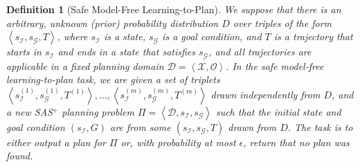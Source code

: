 \documentclass{article}
\newtheorem{definition}{Definition}
\newcommand{\tuple}[1]{\ensuremath{\left \langle #1 \right \rangle }}
\newcommand{\SAS}{SAS$^+$}
\begin{document}
	\begin{definition}[Safe Model-Free Learning-to-Plan] We suppose that there is an arbitrary, unknown (prior) probability distribution $D$ over triples of the form $\tuple{s_\mathcal{I}, s_\mathcal{G}, T}$, where $s_\mathcal{I}$ is a state, $s_\mathcal{G}$ is a goal condition, and $T$ is a trajectory that starts in $s_\mathcal{I}$ and ends in a state that satisfies $s_\mathcal{G}$, 
		and all trajectories are applicable in a fixed planning domain $\mathcal{D}=\tuple{\mathcal{X}, \mathcal{O}}$. 
		In the safe model-free learning-to-plan task, we are given a set of triplets $\tuple{s_\mathcal{I}^{(1)},s_\mathcal{G}^{(1)},T^{(1)}},\ldots,\tuple{s_\mathcal{I}^{(m)},s_\mathcal{G}^{(m)},T^{(m)}}$ drawn independently from $D$, 
		and a new \SAS{} planning problem $\Pi=\tuple{\mathcal{D}, s_\mathcal{I}, s_\mathcal{G}}$  
		such that the initial state and goal condition $(s_\mathcal{I},G)$ are from some $(s_\mathcal{I},s_\mathcal{G},T)$ drawn from $D$. 
		The task is to either output a plan for $\Pi$ or, with probability at most $\epsilon$, return that no plan was found.
		\label{def:learning-to-plan}
	\end{definition}
	
	
\end{document}
